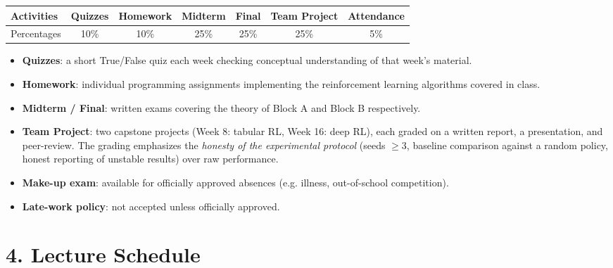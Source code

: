 \documentclass[11pt]{article}
\begin{document}
\begin{center}
\begin{tabular}{@{}lcccccc@{}}
\toprule
Activities & Quizzes & Homework & Midterm & Final & Team Project & Attendance \\
\midrule
Percentages & 10\% & 10\% & 25\% & 25\% & 25\% & 5\% \\
\bottomrule
\end{tabular}
\end{center}

\begin{itemize}[nosep]
\item \textbf{Quizzes}: a short True/False quiz each week checking
  conceptual understanding of that week's material.
\item \textbf{Homework}: individual programming assignments implementing
  the reinforcement learning algorithms covered in class.
\item \textbf{Midterm / Final}: written exams covering the theory of
  Block A and Block B respectively.
\item \textbf{Team Project}: two capstone projects (Week 8: tabular RL,
  Week 16: deep RL), each graded on a written report, a presentation,
  and peer-review. The grading emphasizes the \emph{honesty of the
  experimental protocol} (seeds $\ge 3$, baseline comparison against a
  random policy, honest reporting of unstable results) over raw
  performance.
\item \textbf{Make-up exam}: available for officially approved absences
  (e.g. illness, out-of-school competition).
\item \textbf{Late-work policy}: not accepted unless officially approved.
\end{itemize}

\section*{4. Lecture Schedule}
\end{document}
